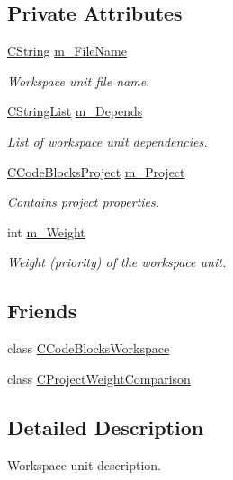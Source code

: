 \subsection*{Private Attributes}
\begin{DoxyCompactItemize}
\item 
\hyperlink{classCString}{C\-String} \hyperlink{classCWorkspaceUnit_a7e229a4a570c2ac60165969ad85e14c3}{m\-\_\-\-File\-Name}
\begin{DoxyCompactList}\small\item\em Workspace unit file name. \end{DoxyCompactList}\item 
\hyperlink{classCStringList}{C\-String\-List} \hyperlink{classCWorkspaceUnit_a6984ed5bc47822d9d8cbc1bf82f19beb}{m\-\_\-\-Depends}
\begin{DoxyCompactList}\small\item\em List of workspace unit dependencies. \end{DoxyCompactList}\item 
\hyperlink{classCCodeBlocksProject}{C\-Code\-Blocks\-Project} \hyperlink{classCWorkspaceUnit_a07129425366054f78a5416c09a028c26}{m\-\_\-\-Project}
\begin{DoxyCompactList}\small\item\em Contains project properties. \end{DoxyCompactList}\item 
int \hyperlink{classCWorkspaceUnit_a12fe48bb00386ea645fe3e7f699fd967}{m\-\_\-\-Weight}
\begin{DoxyCompactList}\small\item\em Weight (priority) of the workspace unit. \end{DoxyCompactList}\end{DoxyCompactItemize}
\subsection*{Friends}
\begin{DoxyCompactItemize}
\item 
class \hyperlink{classCWorkspaceUnit_a202ad87f231d244c3c0c3537e01a269b}{C\-Code\-Blocks\-Workspace}
\item 
class \hyperlink{classCWorkspaceUnit_a67d24e5943ac4af577992f63a808c689}{C\-Project\-Weight\-Comparison}
\end{DoxyCompactItemize}


\subsection{Detailed Description}
Workspace unit description. 

